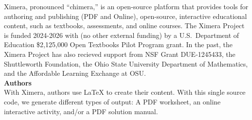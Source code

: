 \documentclass{article}
\begin{document}
\begin{multicols}{2}
    Ximera, pronounced ``chimera,'' is an
    open-source platform that provides tools for authoring and publishing
    (PDF and Online), open-source, interactive educational content, such
    as textbooks, assessments, and online courses.
    The Ximera Project is
    funded 2024-2026 with (no other external funding) by a U.S.\ Department of
    Education \$2,125,000
    Open Textbooks Pilot
    Program grant. In the
    past, the Ximera Project has also recieved support from NSF Grant
    DUE-1245433, the Shuttleworth Foundation, the Ohio State University
    Department of Mathematics, and the Affordable Learning Exchange at
    OSU.\\[.5cm]
    {\sffamily\bfseries Authors}\\
    With Ximera, authors use LaTeX to create their content. With this
    single source code, we generate different types of output: A PDF worksheet, an
    online interactive activity, and/or a PDF solution manual.
    \begin{center}
\end{center}
\end{multicols}
\end{document}
